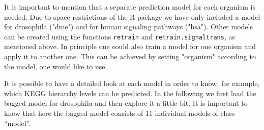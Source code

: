 \documentclass[11pt,a4paper]{article}
\begin{document}
It is important to mention that a separate prediction model for each organism is needed. Due to space restrictions of the R package we have only included a model for drosophila ("dme") and for human signaling pathways ("hsa"). Other models can be created using the functions {\tt retrain} and {\tt retrain.signaltrans}, as mentioned above. In principle one could also train a model for one organism and apply it to another one. This can be achieved by setting "organism" according to the model, one would like to use.

It is possible to have a detailed look at each model in order to know, for example, which KEGG hierarchy levels can be predicted. In the following we first load the bagged model for drosophila and then explore it a little bit. It is important to know that here the bagged model consists of 11 individual models of class ``model''.
\end{document}
